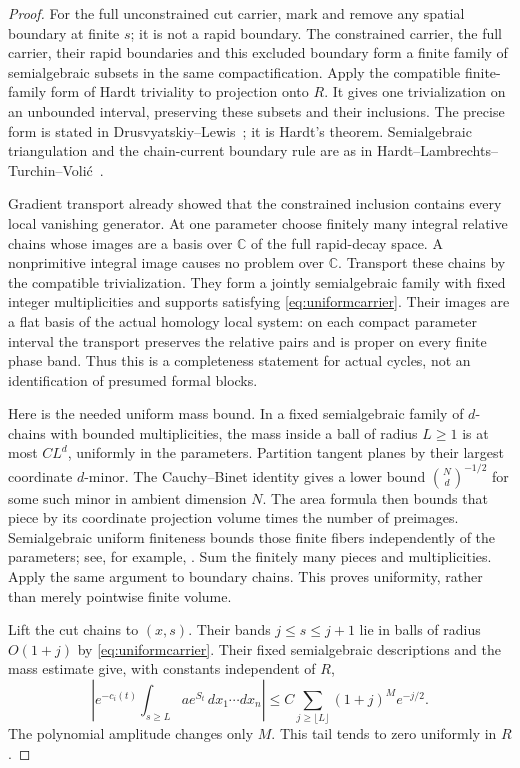 \documentclass[11pt]{article}
\theoremstyle{definition}\newtheorem{definition}[theorem]{Definition}
\theoremstyle{remark}\newtheorem{remark}[theorem]{Remark}
\newcommand{\C}{\mathbb C}
\begin{document}
\begin{proof}
For the full unconstrained cut carrier, mark and remove any
spatial boundary at finite $s$; it is not a rapid boundary.
The constrained carrier, the full carrier, their rapid boundaries
and this excluded boundary form a finite family of semialgebraic
subsets in the same compactification. Apply the compatible
finite-family form of Hardt triviality to projection onto $R$.
It gives one trivialization on an unbounded interval, preserving
these subsets and their inclusions. The precise form is stated
in Drusvyatskiy--Lewis~\cite[Theorem~2.25]{DrusvyatskiyLewis};
it is Hardt's theorem. Semialgebraic triangulation and the
chain-current boundary rule are as in
Hardt--Lambrechts--Turchin--Voli\'c~\cite[Sections~2.1 and~3,
especially Theorem~3.5]{HLTV}.

Gradient transport already showed that the constrained inclusion
contains every local vanishing generator. At one parameter choose
finitely many integral relative chains whose images are a basis
over $\C$ of the full rapid-decay space. A nonprimitive integral
image causes no problem over $\C$. Transport these chains by
the compatible trivialization. They form a jointly semialgebraic
family with fixed integer multiplicities and supports satisfying
\eqref{eq:uniformcarrier}. Their images are a flat basis of the
actual homology local system: on each compact parameter interval
the transport preserves the relative pairs and is proper on
every finite phase band. Thus this is a completeness statement
for actual cycles, not an identification of presumed formal blocks.

Here is the needed uniform mass bound. In a fixed semialgebraic
family of $d$-chains with bounded multiplicities, the mass inside
a ball of radius $L\ge1$ is at most $C L^d$, uniformly in the
parameters. Partition tangent planes by their largest coordinate
$d$-minor. The Cauchy--Binet identity gives a lower bound
$\binom Nd^{-1/2}$ for some such minor in ambient dimension $N$.
The area formula then bounds that piece by its coordinate
projection volume times the number of preimages. Semialgebraic
uniform finiteness bounds those finite fibers independently of
the parameters; see, for example,
\cite[Theorem~2.32]{DrusvyatskiyLewis}. Sum the finitely many
pieces and multiplicities. Apply the same argument to boundary
chains. This proves uniformity, rather than merely pointwise
finite volume.

Lift the cut chains to $(x,s)$. Their bands $j\le s\le j+1$
lie in balls of radius $O(1+j)$ by
\eqref{eq:uniformcarrier}. Their fixed semialgebraic descriptions
and the mass estimate give, with constants independent of $R$,
\begin{equation}\label{eq:uniformcuttail}
 \left|e^{-c_i(t)}\int_{s\ge L}a e^{S_t}\,dx_1\cdots dx_n\right|
 \le C\sum_{j\ge\lfloor L\rfloor}(1+j)^M e^{-j/2}.
\end{equation}
The polynomial amplitude changes only $M$. This tail tends to
zero uniformly in $R$.


\end{proof}
\end{document}
